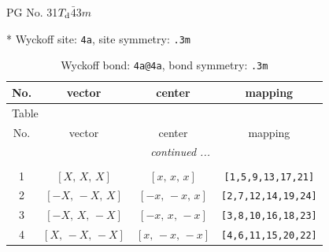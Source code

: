 \documentclass[fleqn,8pt]{jsarticle}
\begin{document}
\setcounter{MaxMatrixCols}{32}

\renewcommand{\tablename}{Table~}
\renewcommand{\figurename}{Figure~}
\begin{center}
\LARGE
PG No. 31\quad$T_{\rm d}$\quad$\bar{4}3m$\quad[ cubic ]
\end{center}


* Wyckoff site: {\tt 4a}, site symmetry: {\tt .3m}
\renewcommand{\arraystretch}{1.2}
\begin{longtable}{cccc}
\caption{Wyckoff bond: {\tt 4a@4a}, bond symmetry: {\tt .3m}}
 \\
 \hline \hline
No. & vector & center & mapping \\ \hline \endfirsthead

\multicolumn{3}{l}{\tablename\ \thetable{}} \\
 \hline \hline
No. & vector & center & mapping \\ \hline \endhead

 \hline \hline
\multicolumn{3}{r}{\footnotesize\it continued ...} \\ \endfoot

 \hline \hline
\multicolumn{3}{r}{} \\ \endlastfoot

1 & $\left[ X,\, X,\, X \right]$ & $\left[ x,\, x,\, x \right]$ & {\tt [1,5,9,13,17,21]} \\ \hline
2 & $\left[ - X,\, - X,\, X \right]$ & $\left[ - x,\, - x,\, x \right]$ & {\tt [2,7,12,14,19,24]} \\ \hline
3 & $\left[ - X,\, X,\, - X \right]$ & $\left[ - x,\, x,\, - x \right]$ & {\tt [3,8,10,16,18,23]} \\ \hline
4 & $\left[ X,\, - X,\, - X \right]$ & $\left[ x,\, - x,\, - x \right]$ & {\tt [4,6,11,15,20,22]} \\
\end{longtable}
\renewcommand{\arraystretch}{1.2}
\end{document}
